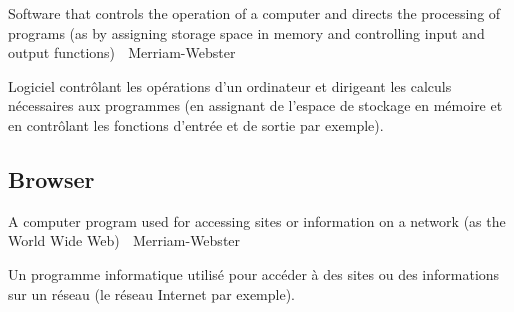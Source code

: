 \documentclass[12pt]{article}
\begin{document}
{\color{bg}Software that controls the operation of a computer and
  directs the processing of programs (as by assigning storage space in
  memory and controlling input and output functions) \textemdash $\;$
  Merriam-Webster }

Logiciel contrôlant les opérations d'un ordinateur et dirigeant les
calculs nécessaires aux programmes (en assignant de l'espace de
stockage en mémoire et en contrôlant les fonctions d'entrée et de
sortie par exemple).

\subsection*{Browser}

{\color{bg}A computer program used for accessing sites or information
  on a network (as the World Wide Web) \textemdash $\;$
  Merriam-Webster }

Un programme informatique utilisé pour accéder à des sites ou des
informations sur un réseau (le réseau Internet par exemple).



\end{document}

